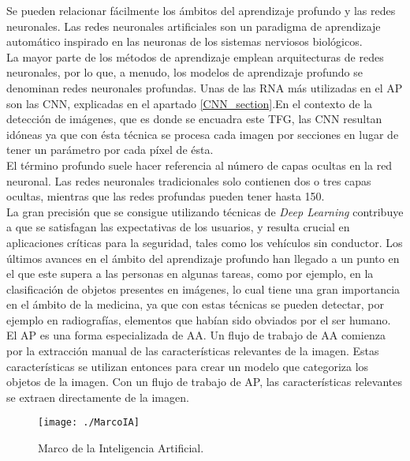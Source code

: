 \documentclass[a4paper, 12pt, oneside]{book}
\begin{document}
Se pueden relacionar fácilmente los ámbitos del aprendizaje profundo y las redes neuronales. Las redes neuronales artificiales son un paradigma de aprendizaje automático inspirado en las neuronas de los sistemas nerviosos biológicos.\\

La mayor parte de los métodos de aprendizaje emplean arquitecturas de redes neuronales, por lo que, a menudo, los modelos de aprendizaje profundo se denominan redes neuronales profundas. Unas de las RNA más utilizadas en el AP son las CNN, explicadas en el apartado \ref{CNN_section}.En el contexto de la detección de imágenes, que es donde se encuadra este TFG, las CNN resultan idóneas ya que con ésta técnica se procesa cada imagen por secciones en lugar de tener un parámetro por cada píxel de ésta.\\

El término profundo suele hacer referencia al número de capas ocultas en la red neuronal. Las redes neuronales tradicionales solo contienen dos o tres capas ocultas, mientras que las redes profundas pueden tener hasta 150.\\

La gran precisión que se consigue utilizando técnicas de \textit{Deep Learning} contribuye a que se satisfagan las expectativas de los usuarios, y resulta crucial en aplicaciones críticas para la seguridad, tales como los vehículos sin conductor. Los últimos avances en el ámbito del aprendizaje profundo han llegado a un punto en el que este supera a las personas en algunas tareas, como por ejemplo, en la clasificación de objetos presentes en imágenes, lo cual tiene una gran importancia en el ámbito de la medicina, ya que con estas técnicas se pueden detectar, por ejemplo en radiografías, elementos que habían sido obviados por el ser humano.\\

El AP es una forma especializada de AA. Un flujo de trabajo de AA comienza por la extracción manual de las características relevantes de la imagen. Estas características se utilizan entonces para crear un modelo que categoriza los objetos de la imagen. Con un flujo de trabajo de AP, las características relevantes se extraen directamente de la imagen.\\

\begin{figure}[H]
\begin{center}
\texttt{[image: ./MarcoIA]}
\caption{Marco de la Inteligencia Artificial.}
\label{MArcoIA}
\end{center}
\end{figure}
\end{document}
